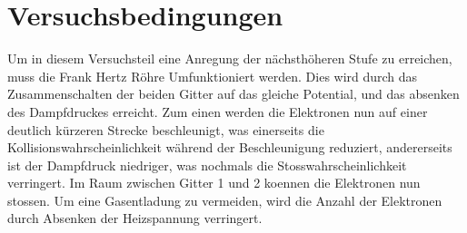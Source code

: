 \section{Versuchsbedingungen}\label{sec:Versuchsbedingungen}
Um in diesem Versuchsteil eine Anregung der nächsthöheren Stufe zu erreichen, muss die Frank Hertz Röhre Umfunktioniert werden.
Dies wird durch das Zusammenschalten der beiden Gitter auf das gleiche Potential, und das absenken des Dampfdruckes erreicht.
Zum einen werden die Elektronen nun auf einer deutlich kürzeren Strecke beschleunigt, was einerseits die Kollisionswahrscheinlichkeit während der Beschleunigung reduziert, andererseits ist der Dampfdruck niedriger, was nochmals die Stosswahrscheinlichkeit verringert.
Im Raum zwischen Gitter 1 und 2 koennen die Elektronen nun stossen.
Um eine Gasentladung zu vermeiden, wird die Anzahl der Elektronen durch Absenken der Heizspannung verringert.\\
